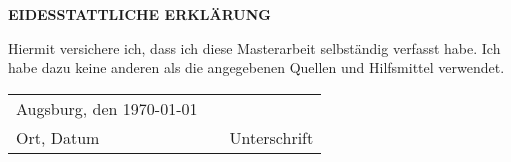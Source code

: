 \newpage
\thispagestyle{empty}
\mbox{}
\newpage
\thispagestyle{empty}

\centerline{\bfseries EIDESSTATTLICHE ERKLÄRUNG}

\vspace{5cm}
Hiermit versichere ich, dass ich diese Masterarbeit selbständig verfasst habe.
Ich habe dazu keine anderen als die angegebenen Quellen und Hilfsmittel
verwendet.

\vspace{1cm}

\begin{center}
    \begin{tabular}[h]{lp{2cm}p{5.5cm}}
        Augsburg, den \today & & \\
        \cline{1-1}
        \cline{3-3}
        Ort, Datum& & Unterschrift
    \end{tabular}
\end{center}

\newpage
\thispagestyle{empty}
\mbox{}

